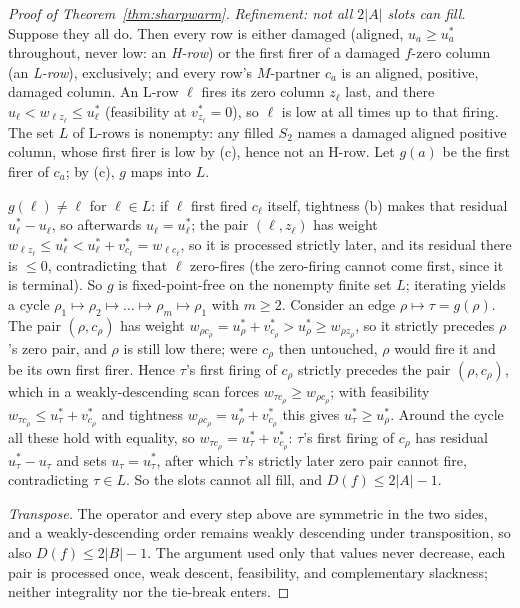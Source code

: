 \begin{proof}[Proof of Theorem~\ref{thm:sharpwarm}]
\emph{Refinement: not all $2|A|$ slots can fill.} Suppose they all do. Then every row is either
damaged (aligned, $u_a \ge u^*_a$ throughout, never low: an \emph{H-row}) or the first firer of a
damaged $f$-zero column (an \emph{L-row}), exclusively; and every row's $M$-partner $c_a$ is an
aligned, positive, damaged column. An L-row $\ell$ fires its zero column $z_\ell$ last, and there
$u_\ell < w_{\ell z_\ell} \le u^*_\ell$ (feasibility at $v^*_{z_\ell} = 0$), so $\ell$ is low at
all times up to that firing. The set $L$ of L-rows is nonempty: any filled $S_2$ names a damaged
aligned positive column, whose first firer is low by (c), hence not an H-row. Let $g(a)$ be the
first firer of $c_a$; by (c), $g$ maps into $L$.

$g(\ell) \ne \ell$ for $\ell \in L$: if $\ell$ first fired $c_\ell$ itself, tightness (b) makes
that residual $u^*_\ell - u_\ell$, so afterwards $u_\ell = u^*_\ell$; the pair $(\ell, z_\ell)$
has weight $w_{\ell z_\ell} \le u^*_\ell < u^*_\ell + v^*_{c_\ell} = w_{\ell c_\ell}$, so it is
processed strictly later, and its residual there is $\le 0$, contradicting that $\ell$ zero-fires
(the zero-firing cannot come first, since it is terminal). So $g$ is fixed-point-free on the nonempty
finite set $L$; iterating yields a cycle
$\rho_1 \mapsto \rho_2 \mapsto \dots \mapsto \rho_m \mapsto \rho_1$ with $m \ge 2$. Consider an
edge $\rho \mapsto \tau = g(\rho)$. The pair $(\rho, c_\rho)$ has weight
$w_{\rho c_\rho} = u^*_\rho + v^*_{c_\rho} > u^*_\rho \ge w_{\rho z_\rho}$, so it strictly
precedes $\rho$'s zero pair, and $\rho$ is still low there; were $c_\rho$ then untouched, $\rho$
would fire it and be its own first firer. Hence $\tau$'s first firing of $c_\rho$ strictly
precedes the pair $(\rho, c_\rho)$, which in a weakly-descending scan forces
$w_{\tau c_\rho} \ge w_{\rho c_\rho}$; with feasibility
$w_{\tau c_\rho} \le u^*_\tau + v^*_{c_\rho}$ and tightness
$w_{\rho c_\rho} = u^*_\rho + v^*_{c_\rho}$ this gives $u^*_\tau \ge u^*_\rho$. Around the cycle
all these hold with equality, so $w_{\tau c_\rho} = u^*_\tau + v^*_{c_\rho}$: $\tau$'s first
firing of $c_\rho$ has residual $u^*_\tau - u_\tau$ and sets $u_\tau = u^*_\tau$, after which
$\tau$'s strictly later zero pair cannot fire, contradicting $\tau \in L$.
So the slots cannot all fill, and $D(f) \le 2|A| - 1$.

\emph{Transpose.} The operator and every step above are symmetric in the two sides, and a
weakly-descending order remains weakly descending under transposition, so also
$D(f) \le 2|B| - 1$. The argument used
only that values never decrease, each pair is processed once, weak descent, feasibility, and
complementary slackness; neither integrality nor the tie-break enters.
\end{proof}

